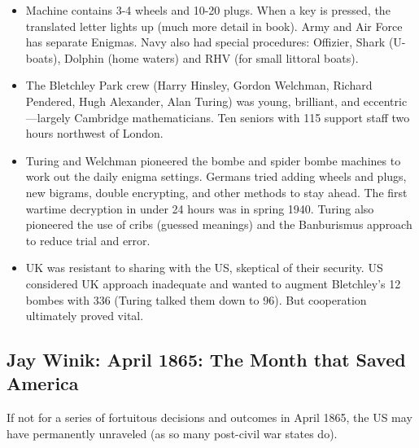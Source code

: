 \documentclass[
]{article}
\begin{document}
\begin{itemize}
\item
  Machine contains 3-4 wheels and 10-20 plugs. When a key is pressed,
  the translated letter lights up (much more detail in book). Army and
  Air Force has separate Enigmas. Navy also had special procedures:
  Offizier, Shark (U-boats), Dolphin (home waters) and RHV (for small
  littoral boats).
\item
  The Bletchley Park crew (Harry Hinsley, Gordon Welchman, Richard
  Pendered, Hugh Alexander, Alan Turing) was young, brilliant, and
  eccentric---largely Cambridge mathematicians. Ten seniors with 115
  support staff two hours northwest of London.
\item
  Turing and Welchman pioneered the bombe and spider bombe machines to
  work out the daily enigma settings. Germans tried adding wheels and
  plugs, new bigrams, double encrypting, and other methods to stay
  ahead. The first wartime decryption in under 24 hours was in spring
  1940. Turing also pioneered the use of cribs (guessed meanings) and
  the Banburismus approach to reduce trial and error.
\item
  UK was resistant to sharing with the US, skeptical of their security.
  US considered UK approach inadequate and wanted to augment Bletchley's
  12 bombes with 336 (Turing talked them down to 96). But cooperation
  ultimately proved vital.
\end{itemize}

\hypertarget{jay-winik-april-1865-the-month-that-saved-america}{%
\subsection{Jay Winik: April 1865: The Month that Saved
America}\label{jay-winik-april-1865-the-month-that-saved-america}}

If not for a series of fortuitous decisions and outcomes in April 1865,
the US may have permanently unraveled (as so many post-civil war states
do).
\end{document}
